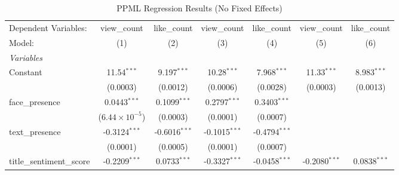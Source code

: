 
\begin{table}[htbp]
   \caption{PPML Regression Results (No Fixed Effects)}
   \centering
   \begin{tabular}{lcccccc}
      \tabularnewline \midrule \midrule
      Dependent Variables:           & view\_count                    & like\_count                    & view\_count                    & like\_count                    & view\_count                   & like\_count\\   
      Model:                         & (1)                            & (2)                            & (3)                            & (4)                            & (5)                           & (6)\\  
      \midrule
      \emph{Variables}\\
      Constant                       & 11.54$^{***}$                  & 9.197$^{***}$                  & 10.28$^{***}$                  & 7.968$^{***}$                  & 11.33$^{***}$                 & 8.983$^{***}$\\   
                                     & (0.0003)                       & (0.0012)                       & (0.0006)                       & (0.0028)                       & (0.0003)                      & (0.0013)\\   
      face\_presence                 & 0.0443$^{***}$                 & 0.1099$^{***}$                 & 0.2797$^{***}$                 & 0.3403$^{***}$                 &                               &   \\   
                                     & ($6.44\times 10^{-5}$)         & (0.0003)                       & (0.0001)                       & (0.0007)                       &                               &   \\   
      text\_presence                 & -0.3124$^{***}$                & -0.6016$^{***}$                & -0.1015$^{***}$                & -0.4794$^{***}$                &                               &   \\   
                                     & (0.0001)                       & (0.0005)                       & (0.0001)                       & (0.0007)                       &                               &   \\   
      title\_sentiment\_score        & -0.2209$^{***}$                & 0.0733$^{***}$                 & -0.3327$^{***}$                & -0.0458$^{***}$                & -0.2080$^{***}$               & 0.0838$^{***}$\\   

\end{tabular}
\end{table}
